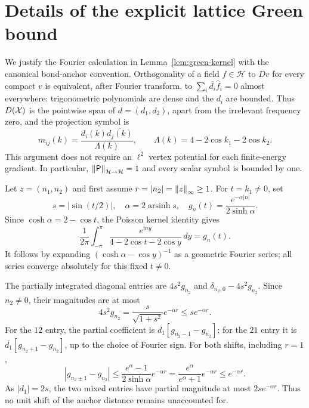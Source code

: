 \section{Details of the explicit lattice Green bound}
\label{app:green-kernel}

We justify the Fourier calculation in Lemma~\ref{lem:green-kernel} with
the canonical bond-anchor convention.  Orthogonality of a field
$f\in\mathcal H$ to $Dv$ for every compact $v$ is equivalent, after
Fourier transform, to
$\sum_i\overline{d_i}\widehat f_i=0$ almost everywhere: trigonometric
polynomials are dense and the $d_i$ are bounded.  Thus $D(\mathcal X)$ is the
pointwise span of $d=(d_1,d_2)$, apart from the irrelevant frequency zero,
and the projection symbol is
\[
 m_{ij}(k)=\frac{d_i(k)\overline{d_j(k)}}{\Lambda(k)},\qquad
 \Lambda(k)=4-2\cos k_1-2\cos k_2.
\]
This argument does not require an $\ell^2$ vertex potential for each
finite-energy gradient.  In particular, $\left\lVert\mathsf P\right\rVert_{\mathcal H\to
\mathcal H}=1$ and every scalar symbol is bounded by one.

Let $z=(n_1,n_2)$ and first assume
$r=|n_2|=\left\lVert z\right\rVert_\infty\ge1$.  For $t=k_1\ne0$, set
\[
 s=|\sin(t/2)|,\quad
 \alpha=2\operatorname{arsinh}s,\quad
 g_n(t)=\frac{e^{-\alpha|n|}}{2\sinh\alpha}.
\]
Since $\cosh\alpha=2-\cos t$, the Poisson kernel identity gives
\begin{equation}
 \frac1{2\pi}\int_{-\pi}^{\pi}
 \frac{e^{\mathrm i n y}}{4-2\cos t-2\cos y}\,dy=g_n(t).
 \label{eq:green-partial}
\end{equation}
It follows by expanding
$(\cosh\alpha-\cos y)^{-1}$ as a geometric Fourier series; all series
converge absolutely for this fixed $t\ne0$.

The partially integrated diagonal entries are
$4s^2g_{n_2}$ and $\delta_{n_2,0}-4s^2g_{n_2}$.  Since $n_2\ne0$,
their magnitudes are at most
\[
 4s^2g_{n_2}
 =\frac{s}{\sqrt{1+s^2}}e^{-\alpha r}
 \le s e^{-\alpha r}.
\]
For the $12$ entry, the partial coefficient is
$d_1[g_{n_2-1}-g_{n_2}]$; for the $21$ entry it is
$\overline{d_1}[g_{n_2+1}-g_{n_2}]$, up to the choice of Fourier sign.
For both shifts, including $r=1$,
\begin{equation}
 |g_{n_2\pm1}-g_{n_2}|
 \le\frac{e^\alpha-1}{2\sinh\alpha}e^{-\alpha r}
 =\frac{e^\alpha}{e^\alpha+1}e^{-\alpha r}
 \le e^{-\alpha r}.
 \label{eq:green-shift-bound}
\end{equation}
As $|d_1|=2s$, the two mixed entries have partial magnitude at most
$2s e^{-\alpha r}$.  Thus no unit shift of the anchor distance remains
unaccounted for.

